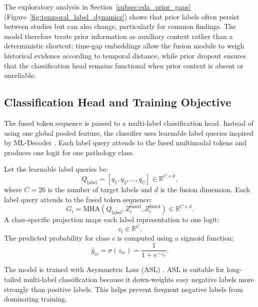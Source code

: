 The exploratory analysis in Section~\ref{subsec:eda_prior_gaps} (Figure~\ref{fig:temporal_label_dynamics}) shows that prior labels often persist between studies but can also change, particularly for common findings. The model therefore treats prior information as auxiliary context rather than a deterministic shortcut: time-gap embeddings allow the fusion module to weigh historical evidence according to temporal distance, while prior dropout ensures that the classification head remains functional when prior context is absent or unreliable.

\subsection{Classification Head and Training Objective}
\label{subsec:method_head_loss}

The fused token sequence is passed to a multi-label classification head. Instead of using one global pooled feature, the classifier uses learnable label queries inspired by ML-Decoder \cite{ridnik2023mldecoder}. Each label query attends to the fused multimodal tokens and produces one logit for one pathology class.

Let the learnable label queries be:
\begin{equation}
Q_{\text{label}} = [q_1, q_2, \ldots, q_C] \in \mathbb{R}^{C \times d},
\end{equation}
where $C=26$ is the number of target labels and $d$ is the fusion dimension. Each label query attends to the fused token sequence:
\begin{equation}
G_i = \mathrm{MHA}(Q_{\text{label}}, Z^{\text{fused}}_i, Z^{\text{fused}}_i) \in \mathbb{R}^{C \times d}.
\end{equation}
A class-specific projection maps each label representation to one logit:
\begin{equation}
z_i \in \mathbb{R}^{C}.
\end{equation}
The predicted probability for class $c$ is computed using a sigmoid function:
\begin{equation}
\hat{y}_{ic} = \sigma(z_{ic}) = \frac{1}{1 + e^{-z_{ic}}}.
\end{equation}

The model is trained with Asymmetric Loss (ASL) \cite{ridnik2021asymmetric}. ASL is suitable for long-tailed multi-label classification because it down-weights easy negative labels more strongly than positive labels. This helps prevent frequent negative labels from dominating training.

